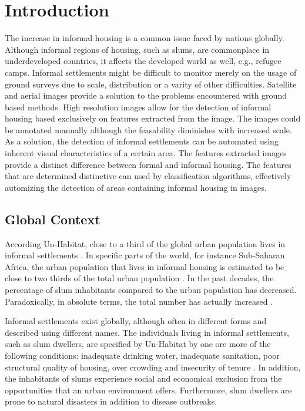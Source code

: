 \section{Introduction}

The increase in informal housing is a common issue faced by nations globally.
Although informal regions of housing, such as slums, are commonplace in
underdeveloped countries, it affects the developed world as well, e.g., refugee
camps. Informal settlements might be difficult to monitor merely on the usage
of ground surveys due to scale, distribution or a varity of other difficulties.
Satellite and aerial images provide a solution to the problems encountered with
ground based methods.  High resolution images allow for the detection of
informal housing based exclusively on features extracted from the image.  The
images could be annotated manually although the feasability diminishes with
increased scale.  As a solution, the detection of informal settlements can be
automated using inherent visual characteristics of a certain area. The features
extracted images provide a distinct difference between formal and informal
housing. The features that are determined distinctive can used by classification
algorithms, effectively automizing the detection of areas containing informal
housing in images.

\subsection{Global Context}
According Un-Habitat, close to a third of the global urban population lives in informal settlements \cite{2016state}. In specific parts of the world, for instance Sub-Saharan Africa, the urban population that lives in informal housing is estimated to be close to two thirds of the total urban population \cite{un2013planning}. In the past decades, the percentage of slum inhabitants compared to the urban population has decreased. Paradoxically, in absolute terms, the total number has actually increased \cite{2016state}.

Informal settlements exist globally, although often in different forms and described using different names. The individuals living in informal settlements, such as slum dwellers, are specified by Un-Habitat by one ore more of the following conditions: inadequate  drinking  water,  inadequate  sanitation, poor  structural quality of housing, over crowding and insecurity of tenure \cite{un2015slum}. In addition, the inhabitants of slums experience social and economical exclusion from the opportunities that an urban environment offers. Furthermore, slum dwellers are prone to natural disasters in addition to disease outbreaks. 

